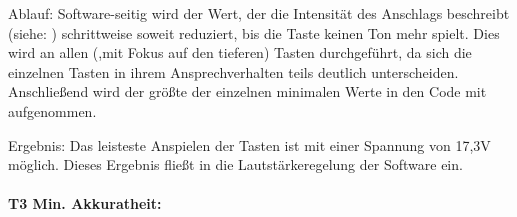 Ablauf: Software-seitig wird der Wert, der die Intensität des Anschlags beschreibt (siehe: ) schrittweise soweit reduziert, bis die Taste keinen Ton mehr spielt.
Dies wird an allen (,mit Fokus auf den tieferen) Tasten durchgeführt, da sich die einzelnen Tasten in ihrem Ansprechverhalten teils deutlich unterscheiden.
Anschließend wird der größte der einzelnen minimalen Werte in den Code mit aufgenommen.

Ergebnis: Das leisteste Anspielen der Tasten ist mit einer Spannung von 17,3V möglich.
Dieses Ergebnis fließt in die Lautstärkeregelung der Software ein.


\paragraph{T3 Min. Akkuratheit:}
